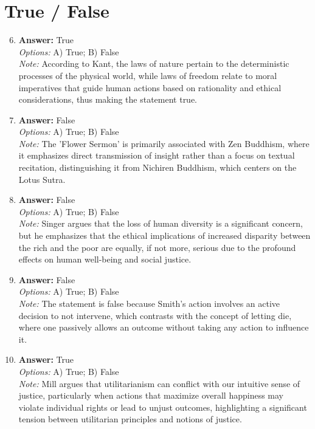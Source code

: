 \documentclass[12pt]{article}
\begin{document}
\section*{True / False}
\begin{enumerate}[label=\arabic*.]
\setcounter{enumi}{5}
\item \textbf{Answer:} True
\\ \textit{Options:} A) True; B) False
\\ \textit{Note:} According to Kant, the laws of nature pertain to the deterministic processes of the physical world, while laws of freedom relate to moral imperatives that guide human actions based on rationality and ethical considerations, thus making the statement true.
\item \textbf{Answer:} False
\\ \textit{Options:} A) True; B) False
\\ \textit{Note:} The 'Flower Sermon' is primarily associated with Zen Buddhism, where it emphasizes direct transmission of insight rather than a focus on textual recitation, distinguishing it from Nichiren Buddhism, which centers on the Lotus Sutra.
\item \textbf{Answer:} False
\\ \textit{Options:} A) True; B) False
\\ \textit{Note:} Singer argues that the loss of human diversity is a significant concern, but he emphasizes that the ethical implications of increased disparity between the rich and the poor are equally, if not more, serious due to the profound effects on human well-being and social justice.
\item \textbf{Answer:} False
\\ \textit{Options:} A) True; B) False
\\ \textit{Note:} The statement is false because Smith's action involves an active decision to not intervene, which contrasts with the concept of letting die, where one passively allows an outcome without taking any action to influence it.
\item \textbf{Answer:} True
\\ \textit{Options:} A) True; B) False
\\ \textit{Note:} Mill argues that utilitarianism can conflict with our intuitive sense of justice, particularly when actions that maximize overall happiness may violate individual rights or lead to unjust outcomes, highlighting a significant tension between utilitarian principles and notions of justice.
\end{enumerate}
\end{document}
